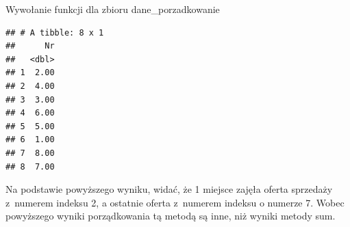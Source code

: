 \documentclass[12pt,a4paper]{report}
\begin{document}
{Wywołanie funkcji dla zbioru dane\_porzadkowanie 

\begin{Shaded}
\begin{Highlighting}[]
\end{Highlighting}
\end{Shaded}

\begin{verbatim}
## # A tibble: 8 x 1
##      Nr
##   <dbl>
## 1  2.00
## 2  4.00
## 3  3.00
## 4  6.00
## 5  5.00
## 6  1.00
## 7  8.00
## 8  7.00
\end{verbatim}

Na podstawie powyższego wyniku, widać, że 1 miejsce zajęła oferta
sprzedaży z~numerem indeksu 2, a ostatnie oferta z~numerem indeksu o
numerze 7. Wobec powyższego wyniki porządkowania tą metodą są inne, niż wyniki metody sum. 
}
\end{document}
